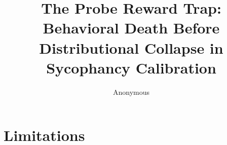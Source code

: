 \documentclass[11pt]{article}
\title{The Probe Reward Trap: Behavioral Death Before Distributional Collapse in Sycophancy Calibration}
\author{Anonymous}
\begin{document}
\maketitle

\begin{abstract}

\end{abstract}

















\section*{Limitations}




\clearpage
\appendix

\end{document}
